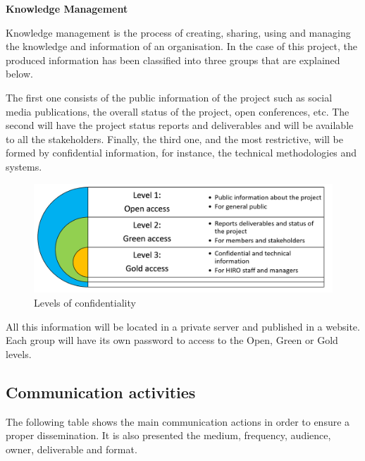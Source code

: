 \textbf{Knowledge Management}

Knowledge management is the process of creating, sharing, using and managing the knowledge and information of an organisation. In the case of this project, the produced information has been classified into three groups that are explained below.

The first one consists of the public information of the project such as social media publications, the overall status of the project, open conferences, etc. The second will have the project status reports and deliverables and will be available to all the stakeholders. Finally, the third one, and the most restrictive, will be formed by confidential information, for instance, the technical methodologies and systems.

\begin{figure}[H]
	\centering
	\includegraphics[width=\textwidth]{images/knowledgement.png}
	\caption{Levels of confidentiality} 
	\label{knowledge}
\end{figure}

All this information will be located in a private server and published in a website. Each group will have its own password to access to the Open, Green or Gold levels.


\subsection{Communication activities}

The following table shows the main communication actions in order to ensure a proper dissemination. It is also presented the medium, frequency, audience, owner, deliverable and format.

